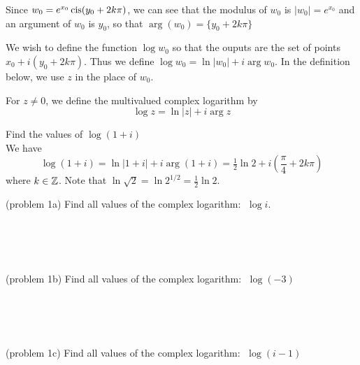 \documentclass[handout]{ximera}
\begin{document}
Since $w_0 = e^{x_0}\operatorname{cis}(y_0 + 2k\pi)$, we can see that the modulus of $w_0$ is $|w_0| = e^{x_0}$ and an 
argument of $w_0$ is $y_0$, so that $\arg(w_0) = \{y_0 + 2k\pi\}$

We wish to define the function $\log w_0$ so that the ouputs are the set of points $x_0 + i(y_0 + 2k\pi)$.  
Thus we define $\log w_0 = \ln|w_0| +i \arg w_0$. 
In the definition below, we use $z$ in the place of $w_0$.
\begin{definition}
For $z \neq 0$, we define the multivalued complex logarithm by
\[
\log z = \ln |z| + i \arg z
\]
\end{definition}

\begin{example}[example 1]
Find the values of $\log(1+i)$\\
We have 
\[
\log(1+i) = \ln |1+i| + i \arg(1+i) = \tfrac12\ln 2 + i\left(\frac{\pi}{4} + 2k\pi\right)
\]
where $k \in \mathbb Z$. Note that $\ln \sqrt 2 = \ln 2^{1/2} = \frac12\ln 2$.
\end{example}

\begin{problem}(problem 1a)
Find all values of the complex logarithm: $\; \log i$.\\
\begin{multipleChoice}
\\
\\
\\
\end{multipleChoice}
\end{problem}


\begin{problem}(problem 1b)
Find all values of the complex logarithm: $\; \log(-3)$\\
\begin{multipleChoice}
\\
\\
\\
\end{multipleChoice}
\end{problem}


\begin{problem}(problem 1c)
Find all values of the complex logarithm: $\; \log(i-1)$\\
\begin{multipleChoice}
\\
\\
\\
\end{multipleChoice}
\end{problem}
\end{document}
